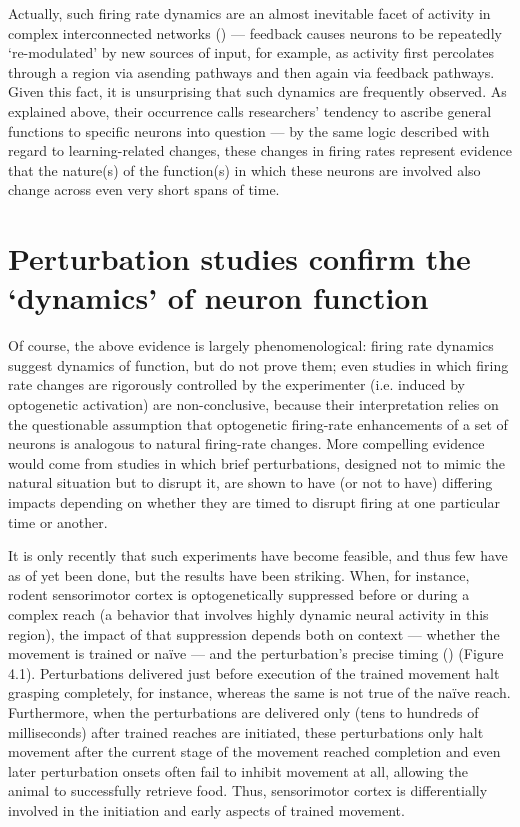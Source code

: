 \begin{refsection}
Actually, such firing rate dynamics are an almost inevitable facet of activity in complex interconnected networks (\cite{pandarinath2018a,yuste2015a}) — feedback causes neurons to be repeatedly ‘re-modulated’ by new sources of input, for example, as activity first percolates through a region via asending pathways and then again via feedback pathways. Given this fact, it is unsurprising that such dynamics are frequently observed. As explained above, their occurrence calls researchers’ tendency to ascribe general functions to specific neurons into question — by the same logic described with regard to learning-related changes, these changes in firing rates represent evidence that the nature(s) of the function(s) in which these neurons are involved also change across even very short spans of time.

\section{Perturbation studies confirm the ‘dynamics’ of neuron function}
Of course, the above evidence is largely phenomenological: firing rate dynamics suggest dynamics of function, but do not prove them; even studies in which firing rate changes are rigorously controlled by the experimenter (i.e. induced by optogenetic activation) are non-conclusive, because their interpretation relies on the questionable assumption that optogenetic firing-rate enhancements of a set of neurons is analogous to natural firing-rate changes. More compelling evidence would come from studies in which brief perturbations, designed not to mimic the natural situation but to disrupt it, are shown to have (or not to have) differing impacts depending on whether they are timed to disrupt firing at one particular time or another.

It is only recently that such experiments have become feasible, and thus few have as of yet been done, but the results have been striking. When, for instance, rodent sensorimotor cortex is optogenetically suppressed before or during a complex reach (a behavior that involves highly dynamic neural activity in this region), the impact of that suppression depends both on context — whether the movement is trained or naïve — and the perturbation’s precise timing (\cite{guo2015a}) (Figure 4.1). Perturbations delivered just before execution of the trained movement halt grasping completely, for instance, whereas the same is not true of the naïve reach. Furthermore, when the perturbations are delivered only (tens to hundreds of milliseconds) after trained reaches are initiated, these perturbations only halt movement after the current stage of the movement reached completion and even later perturbation onsets often fail to inhibit movement at all, allowing the animal to successfully retrieve food. Thus, sensorimotor cortex is differentially involved in the initiation and early aspects of trained movement.


\end{refsection}
